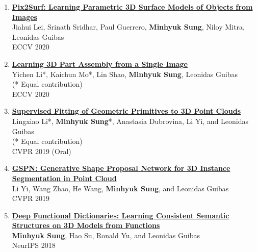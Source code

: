 \documentclass[letterpaper,10pt]{article} %
\newcommand{\blankline}{\quad\pagebreak[2]}
\begin{document}
{\begin{enumerate}
\item \label{eccv20_2}
\href{https://geometry.stanford.edu/projects/pix2surf/}{\textbf{Pix2Surf: Learning Parametric 3D Surface Models of Objects from Images}}\\
Jiahui Lei, Srinath Sridhar, Paul Guerrero, \textbf{Minhyuk Sung}, Niloy Mitra, Leonidas Guibas\\
ECCV 2020\\
\blankline

\item \label{eccv20_1}
\href{https://cs.stanford.edu/~kaichun/impartass/}{\textbf{Learning 3D Part Assembly from a Single Image}}\\
Yichen Li*, Kaichun Mo*, Lin Shao, \textbf{Minhyuk Sung}, Leonidas Guibas\\
(* Equal contribution)\\
ECCV 2020\\
\blankline

\item \label{cvpr19_2}
\href{https://arxiv.org/abs/1811.08988}{\textbf{Supervised Fitting of Geometric Primitives to 3D Point Clouds}}\\
Lingxiao Li*, \textbf{Minhyuk Sung}*, Anastasia Dubrovina, Li Yi, and Leonidas Guibas\\
(* Equal contribution)\\
CVPR 2019 (Oral)\\
\blankline

\item \label{cvpr19_1}
\href{https://arxiv.org/abs/1812.03320}{\textbf{GSPN: Generative Shape Proposal Network for 3D Instance Segmentation in Point Cloud}}\\
Li Yi, Wang Zhao, He Wang, \textbf{Minhyuk Sung}, and Leonidas Guibas\\
CVPR 2019\\
\blankline

\item \label{neurips18}
\href{https://arxiv.org/abs/1805.09957}{\textbf{Deep Functional Dictionaries: Learning Consistent Semantic Structures on 3D Models from Functions}}\\
\textbf{Minhyuk Sung}, Hao Su, Ronald Yu, and Leonidas Guibas\\
NeurIPS 2018\\
\blankline


\end{enumerate}}
\end{document}

